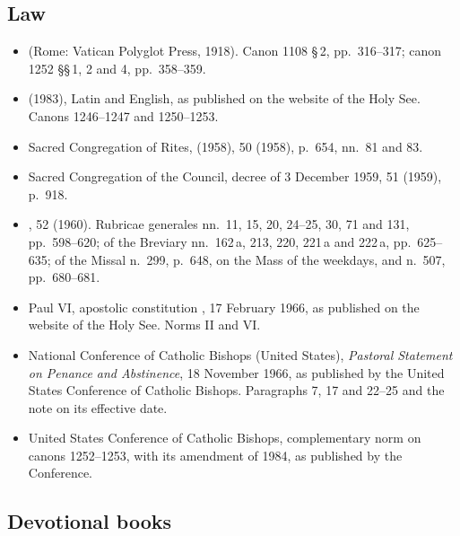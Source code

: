 \subsection{Law}

\begin{itemize}[leftmargin=1.3em, itemsep=0.3em]
\item {} (Rome: Vatican Polyglot Press, 1918). Canon 1108 \S\,2,
pp.~316--317; canon 1252 \S\S\,1, 2 and 4, pp.~358--359.
\item {} (1983), Latin and English, as published on the website of the
Holy See. Canons 1246--1247 and 1250--1253.
\item Sacred Congregation of Rites,  (1958),
 50 (1958), p.~654, nn.~81 and 83.
\item Sacred Congregation of the Council, decree of 3 December 1959,  51 (1959), p.~918.
\item {},  52 (1960).
Rubricae generales nn.~11, 15, 20, 24--25, 30, 71 and 131, pp.~598--620; of the Breviary
nn.~162\,a, 213, 220, 221\,a and 222\,a, pp.~625--635; of the Missal n.~299, p.~648, on the
Mass of the weekdays, and n.~507, pp.~680--681.
\item Paul VI, apostolic constitution , 17 February 1966, as published on the
website of the Holy See. Norms II and VI.
\item National Conference of Catholic Bishops (United States), \textit{Pastoral Statement on
Penance and Abstinence}, 18 November 1966, as published by the United States Conference of
Catholic Bishops. Paragraphs 7, 17 and 22--25 and the note on its effective date.
\item United States Conference of Catholic Bishops, complementary norm on canons 1252--1253, with
its amendment of 1984, as published by the Conference.
\end{itemize}

\subsection{Devotional books}


